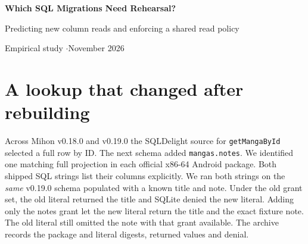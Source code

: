\documentclass[11pt,a4paper]{article}
\newcommand{\code}[1]{\texttt{#1}}
\begin{document}
\begin{center}
{\LARGE\bfseries Which SQL Migrations Need Rehearsal?\par}
\vspace{4pt}
{\large Predicting new column reads and enforcing a shared read policy\par}
\vspace{6pt}
{\small Empirical study \enspace$\cdot$\enspace November 2026}
\end{center}

\begin{abstract}
Rebuilding an unchanged lookup in Mihon made it read a user's private notes. We ask what a reviewer could predict from the old program and the planned schema. We froze four predictors before testing five additional SQLDelight project histories. Across 225 database transitions, 157 supported surviving queries acquired reads. A broad table diff named the exact added set in 106 cases, cached full-column coverage in 71, and old-query rehearsal in 42. Rehearsal produced zero extra predicted fields on the supported survivors. Its two exclusive successes against coverage came from the same changed predicate in two FeedFlow views. In 77 transitions with complete catalogs, we enforced one read policy per database. Retaining old access admitted 991 of 1,023 next queries. Uncapped diff admitted 1,006 with one unused new grant. Padded diff admitted 1,010 with 222. The strongest field predictor, the smallest review queue and the policy preserving the most queries answer different operational questions.
\end{abstract}

\section{A lookup that changed after rebuilding}
Across Mihon v0.18.0 and v0.19.0 the SQLDelight source for \code{getMangaById} selected a full row by ID. The next schema added \code{mangas.notes}. We identified one matching full projection in each official x86-64 Android package. Both shipped SQL strings list their columns explicitly. We ran both strings on the \emph{same} v0.19.0 schema populated with a known title and note. Under the old grant set, the old literal returned the title and SQLite denied the new literal. Adding only the notes grant let the new literal return the title and the exact fixture note. The old literal still omitted the note with that grant available. The archive records the package and literal digests, returned values and denial.
\end{document}
